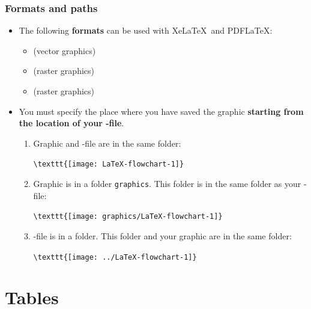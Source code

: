 \begin{frame}[fragile]
\frametitle{Formats and paths}

\begin{itemize}
\item The following \textbf{formats} can be used with Xe\LaTeX\ and PDF\LaTeX :
	\begin{itemize}
	\item {} (vector graphics)
	\item {} (raster graphics)
	\item {} (raster graphics)
	\end{itemize}

\pause 

\item You must specify the place where you have saved the graphic \textbf{starting from the location of your -file}.

\begin{enumerate}
	\item Graphic and  -file are in the same folder:	
	
	\lstinline|\texttt{[image: LaTeX-flowchart-1]}|
	
	\item Graphic is in a folder \texttt{graphics}. This folder is in the same folder as your  -file: 
	
	\lstinline|\texttt{[image: graphics/LaTeX-flowchart-1]}|
	
	\item {}-file is in a folder. This folder and your graphic are in the same folder: 
	
	\lstinline|\texttt{[image: ../LaTeX-flowchart-1]}|
\end{enumerate}

\end{itemize}

\end{frame}


\section{Tables}

